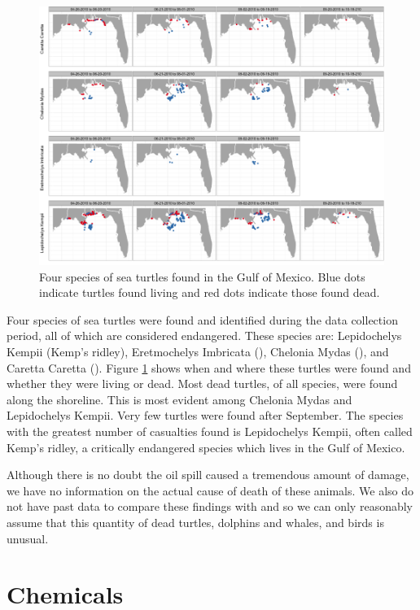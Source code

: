 \documentclass[11pt]{article}
\begin{document}
\begin{figure}[htbp] %
   \centering
   \includegraphics[width=5in]{turtles.png} 
   \caption{Four species of sea turtles found in the Gulf of Mexico.  Blue dots indicate turtles found living and red dots indicate those found dead.}
   \label{turtles}
\end{figure}

Four species of sea turtles were found and identified during the data collection period, all of which are considered endangered.  These species are: Lepidochelys Kempii (Kemp's ridley), Eretmochelys Imbricata (), Chelonia Mydas (), and Caretta Caretta (). Figure \ref{turtles} shows when and where these turtles were found and whether they were living or dead. Most dead turtles, of all species, were found along the shoreline. This is most evident among Chelonia Mydas and Lepidochelys Kempii.  Very few turtles were found after September. The species with the greatest number of casualties found is Lepidochelys Kempii, often called Kemp's ridley, a critically endangered species which lives in the Gulf of Mexico. 

Although there is no doubt the oil spill caused a tremendous amount of damage, we have no information on the actual cause of death of these animals.  We also do not have past data to compare these findings with and so we can only reasonably assume that this quantity of dead turtles, dolphins and whales, and birds is unusual.  
\section{Chemicals}
\end{document}
